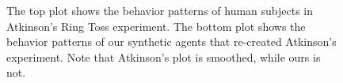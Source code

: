 \begin{figure}[!h]
  \begin{center}
    \caption{The top plot shows the behavior patterns of human
      subjects in Atkinson's Ring Toss experiment.  The bottom plot
      shows the behavior patterns of our synthetic agents that
      re-created Atkinson's experiment.  Note that Atkinson's plot is
      smoothed, while ours is not.}
  \end{center}
  \label{fig:ring-toss-plots}
\end{figure}


